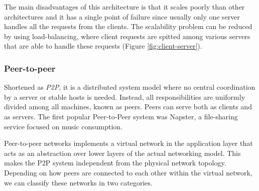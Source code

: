 The main disadvantages of this architecture is that it scales poorly than other architectures and it has a single point of failure since usually only one server handles all the requests from the clients. The scalability problem can be reduced by using load-balancing, where client requests are spitted among various servers that are able to handle these requests (Figure \ref{fig:client-server}).

\subsubsection*{Peer-to-peer}
Shortened as \textit{P2P}, it is a distributed system model where no central coordination by a server or stable hosts is needed. Instead, all responsibilities are uniformly divided among all machines, known as peers. Peers can serve both as clients and as servers\cite{p2p-principles}.
The first popular Peer-to-Peer system was Napster, a file-sharing service focused on music consumption.

Peer-to-peer networks implements a virtual network in the application layer that acts as an abstraction over lower layers of the actual networking model. This makes the P2P system independent from the physical network topology. Depending on how peers are connected to each other within the virtual network, we can classify these networks in two categories.


